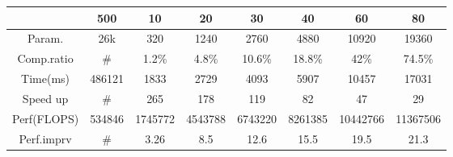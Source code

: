 

\begin{tabular}{cccccccc}
\toprule
	 		&		500		&	10		&	20		&	30		&	40		&	60		&	80		\\	\midrule
 Param.		&		26k		&	320		&	1240	&	2760	&	4880	&	10920	&	19360	 \\	\hline
Comp.ratio	&		\#		&	1.2\%	&	4.8\%	&	10.6\%	&	18.8\%	&	42\%	&	74.5\% 	\\	\hline
Time(ms)	&		486121	&	1833		&	2729	&	4093	&	5907	&	10457	&	17031 \\	\hline
Speed up	&		\#		&	265		&	178		&	119		&	82		&	47		&	29 \\	\hline
Perf(FLOPS)	&		534846	&	1745772	&	4543788	&	6743220	&	8261385	&	10442766&	11367506	\\	\hline
Perf.imprv	&		\#		&	3.26	&	8.5		&	12.6	&	15.5	&	19.5	&	21.3	\\
\bottomrule
\end{tabular}



